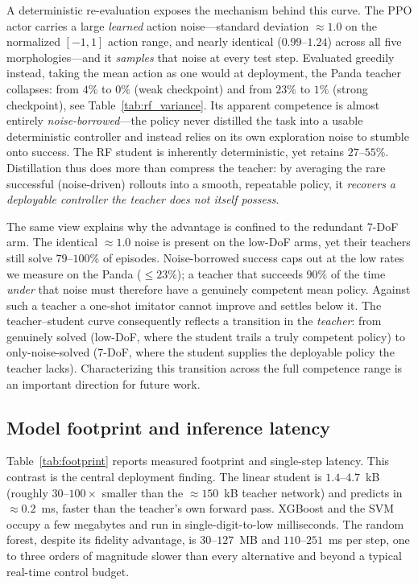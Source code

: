 \documentclass[conference]{IEEEtran}
\begin{document}
A deterministic re-evaluation exposes the mechanism behind this curve. The PPO
actor carries a large \emph{learned} action noise---standard deviation
$\approx\!1.0$ on the normalized $[-1,1]$ action range, and nearly identical
($0.99$--$1.24$) across all five morphologies---and it \emph{samples} that noise
at every test step. Evaluated greedily instead, taking the mean action as one
would at deployment, the Panda teacher collapses: from $4\%$ to $0\%$ (weak
checkpoint) and from $23\%$ to $1\%$ (strong checkpoint), see
Table~\ref{tab:rf_variance}. Its apparent competence is almost entirely
\emph{noise-borrowed}---the policy never distilled the task into a usable
deterministic controller and instead relies on its own exploration noise to
stumble onto success. The RF student is inherently deterministic, yet retains
$27$--$55\%$. Distillation thus does more than compress the teacher: by averaging
the rare successful (noise-driven) rollouts into a smooth, repeatable policy, it
\emph{recovers a deployable controller the teacher does not itself possess}.

The same view explains why the advantage is confined to the redundant 7-DoF arm.
The identical $\approx\!1.0$ noise is present on the low-DoF arms, yet their
teachers still solve $79$--$100\%$ of episodes. Noise-borrowed success caps out
at the low rates we measure on the Panda ($\le 23\%$); a teacher that succeeds
$90\%$ of the time \emph{under} that noise must therefore have a genuinely
competent mean policy. Against such a teacher a one-shot imitator cannot improve
and settles below it. The teacher--student curve consequently reflects a
transition in the \emph{teacher}: from genuinely solved (low-DoF, where the
student trails a truly competent policy) to only-noise-solved (7-DoF, where the
student supplies the deployable policy the teacher lacks). Characterizing this
transition across the full competence range is an important direction for future
work.

\subsection{Model footprint and inference latency}
Table~\ref{tab:footprint} reports measured footprint and single-step latency.
This contrast is the central deployment finding. The linear student
is \(1.4\)--\(4.7\)~kB (roughly \(30\)--\(100\times\) smaller than the
\(\approx\!150\)~kB teacher network) and predicts in \(\approx\!0.2\)~ms,
faster than the teacher's own forward pass. XGBoost and the SVM occupy a
few megabytes and run in single-digit-to-low milliseconds. The random forest,
despite its fidelity advantage, is \(30\)--\(127\)~MB and \(110\)--\(251\)~ms per
step, one to three orders of magnitude slower than every alternative and beyond a
typical real-time control budget.
\end{document}
